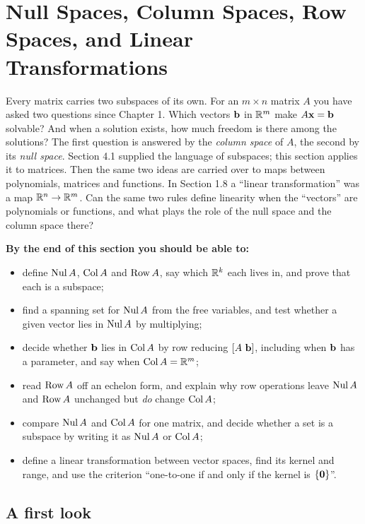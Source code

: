 \documentclass[11pt]{article}
\begin{document}
\section{Null Spaces, Column Spaces, Row Spaces, and Linear Transformations}

\begin{guide}
Every matrix carries two subspaces of its own. For an $m\times n$ matrix $A$ you have asked two questions since Chapter 1. Which vectors $\mathbf{b}$ in $\mathbb{R}^m$ make $A\mathbf{x}=\mathbf{b}$ solvable? And when a solution exists, how much freedom is there among the solutions? The first question is answered by the \emph{column space} of $A$, the second by its \emph{null space}. Section 4.1 supplied the language of subspaces; this section applies it to matrices. Then the same two ideas are carried over to maps between polynomials, matrices and functions. In Section 1.8 a ``linear transformation'' was a map $\mathbb{R}^n\to\mathbb{R}^m$. Can the same two rules define linearity when the ``vectors'' are polynomials or functions, and what plays the role of the null space and the column space there?
\end{guide}

\textbf{By the end of this section you should be able to:}
\begin{itemize}
  \item define $\operatorname{Nul} A$, $\operatorname{Col} A$ and $\operatorname{Row} A$, say which $\mathbb{R}^k$ each lives in, and prove that each is a subspace;
  \item find a spanning set for $\operatorname{Nul} A$ from the free variables, and test whether a given vector lies in $\operatorname{Nul} A$ by multiplying;
  \item decide whether $\mathbf{b}$ lies in $\operatorname{Col} A$ by row reducing $[A\ \mathbf{b}]$, including when $\mathbf{b}$ has a parameter, and say when $\operatorname{Col} A=\mathbb{R}^m$;
  \item read $\operatorname{Row} A$ off an echelon form, and explain why row operations leave $\operatorname{Nul} A$ and $\operatorname{Row} A$ unchanged but \emph{do} change $\operatorname{Col} A$;
  \item compare $\operatorname{Nul} A$ and $\operatorname{Col} A$ for one matrix, and decide whether a set is a subspace by writing it as $\operatorname{Nul} A$ or $\operatorname{Col} A$;
  \item define a linear transformation between vector spaces, find its kernel and range, and use the criterion ``one-to-one if and only if the kernel is $\{\mathbf{0}\}$''.
\end{itemize}

\subsection*{A first look}
\end{document}

